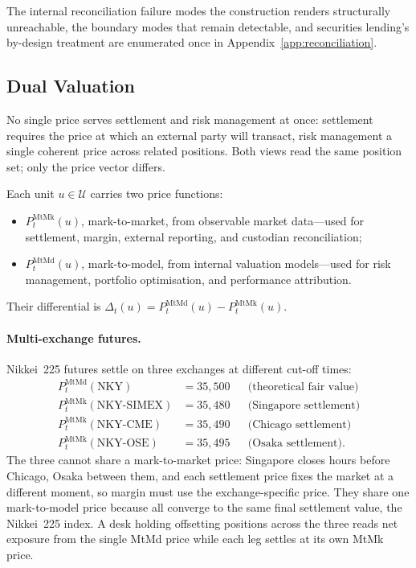 The internal reconciliation failure modes the construction renders structurally unreachable, the boundary modes that remain detectable, and securities lending's by-design treatment are enumerated once in Appendix~\ref{app:reconciliation}.

\subsection{Dual Valuation}

No single price serves settlement and risk management at once: settlement requires the price at which an external party will transact, risk management a single coherent price across related positions. Both views read the same position set; only the price vector differs.

\begin{definition}
Each unit $u\in\mathcal{U}$ carries two price functions:
\begin{itemize}[nosep]
\item $P_t^{\text{MtMk}}(u)$, mark-to-market, from observable market data---used for settlement, margin, external reporting, and custodian reconciliation;
\item $P_t^{\text{MtMd}}(u)$, mark-to-model, from internal valuation models---used for risk management, portfolio optimisation, and performance attribution.
\end{itemize}
Their differential is $\Delta_t(u)=P_t^{\text{MtMd}}(u)-P_t^{\text{MtMk}}(u)$.
\end{definition}

\paragraph{Multi-exchange futures.} Nikkei~225 futures settle on three exchanges at different cut-off times:
\begin{align*}
P_t^{\text{MtMd}}(\text{NKY}) &= 35{,}500 && \text{(theoretical fair value)}\\
P_t^{\text{MtMk}}(\text{NKY-SIMEX}) &= 35{,}480 && \text{(Singapore settlement)}\\
P_t^{\text{MtMk}}(\text{NKY-CME}) &= 35{,}490 && \text{(Chicago settlement)}\\
P_t^{\text{MtMk}}(\text{NKY-OSE}) &= 35{,}495 && \text{(Osaka settlement)}.
\end{align*}
The three cannot share a mark-to-market price: Singapore closes hours before Chicago, Osaka between them, and each settlement price fixes the market at a different moment, so margin must use the exchange-specific price. They share one mark-to-model price because all converge to the same final settlement value, the Nikkei~225 index. A desk holding offsetting positions across the three reads net exposure from the single MtMd price while each leg settles at its own MtMk price.

